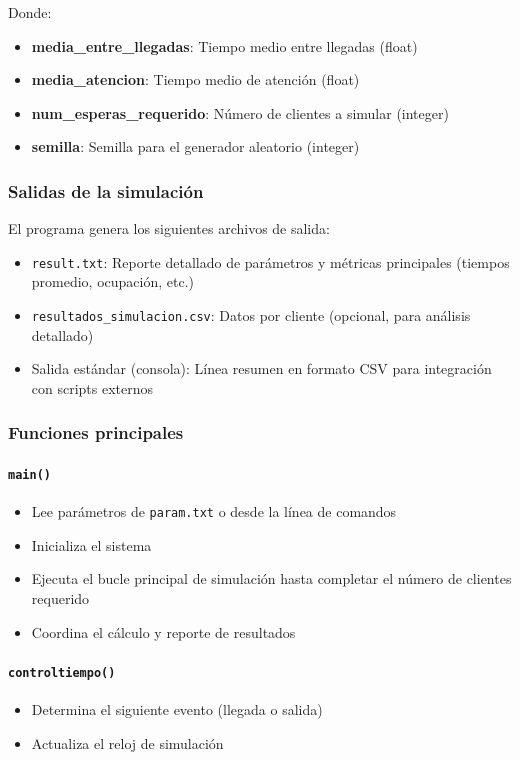 \documentclass{article}
\begin{document}
Donde:
\begin{itemize}
    \item \textbf{media\_entre\_llegadas}: Tiempo medio entre llegadas (float)
    \item \textbf{media\_atencion}: Tiempo medio de atención (float)
    \item \textbf{num\_esperas\_requerido}: Número de clientes a simular (integer)
    \item \textbf{semilla}: Semilla para el generador aleatorio (integer)
\end{itemize}

\subsubsection{Salidas de la simulación}

El programa genera los siguientes archivos de salida:

\begin{itemize}
    \item \texttt{result.txt}: Reporte detallado de parámetros y métricas principales (tiempos promedio, ocupación, etc.)
    \item \texttt{resultados\_simulacion.csv}: Datos por cliente (opcional, para análisis detallado)
    \item Salida estándar (consola): Línea resumen en formato CSV para integración con scripts externos
\end{itemize}

\subsubsection{Funciones principales}

\paragraph{\texttt{main()}}
\begin{itemize}
    \item Lee parámetros de \texttt{param.txt} o desde la línea de comandos
    \item Inicializa el sistema
    \item Ejecuta el bucle principal de simulación hasta completar el número de clientes requerido
    \item Coordina el cálculo y reporte de resultados
\end{itemize}

\paragraph{\texttt{controltiempo()}}
\begin{itemize}
    \item Determina el siguiente evento (llegada o salida)
    \item Actualiza el reloj de simulación
\end{itemize}
\end{document}
